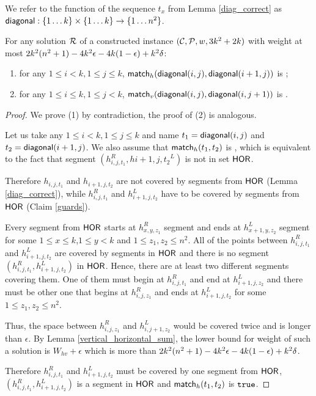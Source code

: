 {{{{We refer to the function of the sequence $t_x$ from Lemma \ref{diag_correct}
as $\mathsf{diagonal} : \{1 \ldots k\} \times \{1 \ldots k\} \rightarrow \{1 \ldots n^2\}$.

\begin{lemma}
\label{vertical_horizontal_synchronized}
For any solution $\mathcal{R}$
of a constructed instance $(\mathcal{C}, \mathcal{P}, w, 3k^2+2k)$
with weight at most $2k^2(n^2+1) - 4k^2\epsilon -4k(1-\epsilon) +k^2\delta$:
\begin{enumerate}
\item 
for any $1 \le i < k, 1 \le j \le k$,
$\mathsf{match}_h(\mathsf{diagonal}(i, j),\mathsf{diagonal}(i+1, j))$ is \true;
\item 
for any $1 \le i \le k, 1 \le j < k$,
$\mathsf{match}_v(\mathsf{diagonal}(i, j),\mathsf{diagonal}(i, j+1))$ is \true.
\end{enumerate}
\end{lemma}

\begin{proof}
We prove (1) by contradiction, the proof of (2) is analogous.

Let us take any $1 \le i < k, 1 \le j \le k$
and name $t_1 = \mathsf{diagonal}(i, j)$ and $t_2 = \mathsf{diagonal}(i+1, j)$.
We also assume that $\mathsf{match}_h(t_1,t_2)$ is \false,
which is equivalent to the fact that
segment $(h_{i,j,t_1}^R, h{i+1,j,t_2}^L)$
is not in set $\mathsf{HOR}$.

Therefore $h_{i,j,t_1}$ and $h_{i+1,j,t_2}$
are not covered by segments from $\mathsf{HOR}$ (Lemma \ref{diag_correct}),
while $h^R_{i,j,t_1}$ and $h^L_{i+1,j,t_2}$
have to be covered by segments from $\mathsf{HOR}$ (Claim \ref{guards}).

Every segment from $\mathsf{HOR}$ starts at $h^R_{x,y,z_1}$
segment and ends at $h^L_{x+1,y,z_2}$ segment for some
$1 \le x \le k$,$1 \le y < k$ and $1 \le z_1, z_2 \le n^2$.
All of the points between $h^R_{i,j,t_1}$ and $h^L_{i+1,j,t_2}$
are covered by segments in $\mathsf{HOR}$ 
and there is no segment $(h^R_{i,j,t_1}, h^L_{i+1,j,t_2})$ in $\mathsf{HOR}$.
Hence, there are at least two different segments covering them.
One of them must begin
at $h^R_{i,j,t_1}$ and end at $h^L_{i+1,j,z_2}$
and there must be other one that begins at $h^R_{i,j,z_1}$
and ends at $h^L_{i+1,j,t_2}$
for some $1 \le z_1, z_2 \le n^2$.

Thus, the space between $h^R_{i,j,z_1}$ and $h^L_{i,j+1,z_2}$
would be covered twice and is longer than $\epsilon$.
By Lemma \ref{vertical_horizontal_sum},
the lower bound for weight of such a solution is $W_{hv} + \epsilon$
which is more than $2k^2(n^2+1) - 4k^2\epsilon -4k(1-\epsilon) +k^2\delta$.

Therefore $h^R_{i,j,t_1}$ and $h^L_{i+1,j,t_2}$ must be covered
by one segment from $\mathsf{HOR}$,
$(h^R_{i,j,t_1}, h^L_{i+1,j,t_2})$ is a segment in $\mathsf{HOR}$
and $\mathsf{match}_h(t_1,t_2)$ is $\texttt{true}$.
\end{proof}


}}}}

